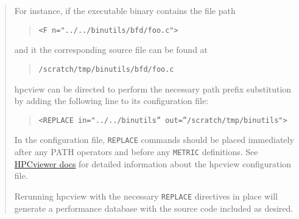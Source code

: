 \documentclass{article}
\begin{document}
\begin{quote}
For instance, if the executable binary contains the file path 
\begin{quote}
\verb|<F n="../../binutils/bfd/foo.c">|
\end{quote}
and it the corresponding source file can be found at 
\begin{quote}
\verb|/scratch/tmp/binutils/bfd/foo.c|
\end{quote}
hpcview can be directed to perform the necessary path prefix substitution by 
adding the following line to its configuration file: 
\begin{quote}
\verb|<REPLACE in="../../binutils” out=”/scratch/tmp/binutils">|
\end{quote}

In the configuration file, \verb|REPLACE| commands should be placed
immediately after any PATH operators and before any \verb|METRIC|
definitions. See
 \href{http://hipersoft.cs.rice.edu/hpctoolkit/documentation/doc/dtd_hpcview.html}{HPCviewer docs}  
for detailed information about the hpcview configuration file.

Rerunning hpcview with the necessary \verb|REPLACE| directives in place will
generate a performance database with the source code included as
desired.
\end{quote}
\end{document}
